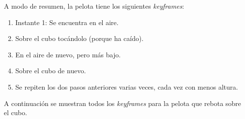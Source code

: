 \documentclass{article}
\begin{document}
\bigskip

A modo de resumen, la pelota tiene los siguientes \textit{keyframes}:

\begin{enumerate}
    \item Instante 1: Se encuentra en el aire.
    \item Sobre el cubo tocándolo (porque ha caído).
    \item En el aire de nuevo, pero más bajo.
    \item Sobre el cubo de nuevo.
    \item Se repiten los dos pasos anteriores varias veces, cada vez con menos altura.
\end{enumerate}

A continuación se muestran todos los \textit{keyframes} para la pelota que rebota sobre el cubo.
\end{document}
